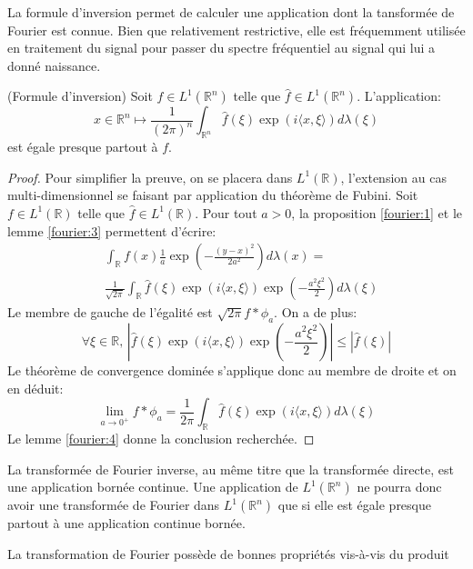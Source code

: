 La formule d'inversion permet de calculer une application dont la tansformée
de Fourier est connue. Bien que relativement restrictive, elle est fréquemment
utilisée en traitement du signal pour passer du spectre fréquentiel au signal
qui lui a donné naissance.
\begin{mandatory}
\begin{theorem}{(Formule d'inversion)}
Soit $f \in L^1(\mathbb{R}^n)$ telle que $\widehat{f} \in L^1(\mathbb{R}^n)$.
L'application:
\[
x \in \mathbb{R}^n \mapsto \frac{1}{(2\pi)^n} \int_{\mathbb{R}^n}
\widehat{f}(\xi)\exp\left(i \langle x, \xi \rangle\right) d \lambda(\xi)
\]
est égale presque partout à $f$.
\end{theorem}
\end{mandatory}
\begin{proof}
Pour simplifier la preuve, on se placera dans $L^1(\mathbb{R})$, l'extension au
cas multi-dimensionnel se faisant par application du théorème de Fubini.
Soit $f \in L^1(\mathbb{R})$ telle que $\widehat{f} \in L^1(\mathbb{R})$. Pour
tout $a>0$, la proposition \ref{fourier:1} et le lemme \ref{fourier:3}
permettent d'écrire:
\begin{align*}
& \int_{\mathbb{R}}f(x) \frac{1}{a}\exp\left(-\frac{(y-x)^2}{2a^2}\right) d
\lambda(x) = \\
& \frac{1}{\sqrt{2\pi}} \int_{\mathbb{R}}
\widehat{f}(\xi)\exp\left(i \langle x, \xi
\rangle\right)\exp\left(-\frac{a^2\xi^2}{2}\right) d \lambda(\xi)
\end{align*}
Le membre de gauche de l'égalité est $\sqrt{2\pi}f*\phi_a$. 
On a de plus:
\[
\forall \xi \in \mathbb{R}, \,
\left|\widehat{f}(\xi)\exp\left(i \langle x, \xi
\rangle\right)\exp\left(-\frac{a^2\xi^2}{2}\right)\right| \leq |\widehat{f}(\xi)|
\]
Le théorème de convergence dominée s'applique donc au membre de droite et on en
déduit:
\[
\lim_{a \to 0^+} f * \phi_a = \frac{1}{2 \pi}  \int_{\mathbb{R}}
\widehat{f}(\xi)\exp\left(i \langle x, \xi
\rangle\right) d \lambda(\xi)
\]
Le lemme \ref{fourier:4} donne la conclusion recherchée.
\end{proof}
\begin{rem}
La transformée de Fourier inverse, au même titre que la transformée directe, est
une application bornée continue. Une application de $L^1(\mathbb{R}^n)$ ne
pourra donc avoir une transformée de Fourier dans $L^1(\mathbb{R}^n)$
que si elle est égale presque partout à une application continue bornée. 
\end{rem}
La transformation de Fourier possède de bonnes propriétés vis-à-vis du produit
